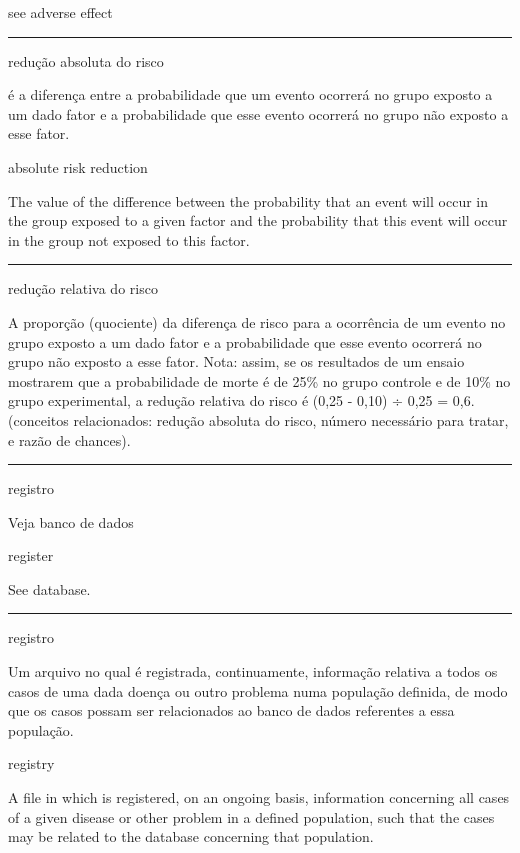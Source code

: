 \documentclass[
]{book}
\begin{document}
see adverse effect

\begin{center}\rule{0.5\linewidth}{0.5pt}\end{center}

redução absoluta do risco

é a diferença entre a probabilidade que um evento ocorrerá no grupo exposto a um dado fator e a probabilidade que esse evento ocorrerá no grupo não exposto a esse fator.

absolute risk reduction

The value of the difference between the probability that an event will occur in the group exposed to a given factor and the probability that this event will occur in the group not exposed to this factor.

\begin{center}\rule{0.5\linewidth}{0.5pt}\end{center}

redução relativa do risco

A proporção (quociente) da diferença de risco para a ocorrência de um evento no grupo exposto a um dado fator e a probabilidade que esse evento ocorrerá no grupo não exposto a esse fator. Nota: assim, se os resultados de um ensaio mostrarem que a probabilidade de morte é de 25\% no grupo controle e de 10\% no grupo experimental, a redução relativa do risco é (0,25 - 0,10) ÷ 0,25 = 0,6. (conceitos relacionados: redução absoluta do risco, número necessário para tratar, e razão de chances).

\begin{center}\rule{0.5\linewidth}{0.5pt}\end{center}

registro

Veja banco de dados

register

See database.

\begin{center}\rule{0.5\linewidth}{0.5pt}\end{center}

registro

Um arquivo no qual é registrada, continuamente, informação relativa a todos os casos de uma dada doença ou outro problema numa população definida, de modo que os casos possam ser relacionados ao banco de dados referentes a essa população.

registry

A file in which is registered, on an ongoing basis, information concerning all cases of a given disease or other problem in a defined population, such that the cases may be related to the database concerning that population.
\end{document}
